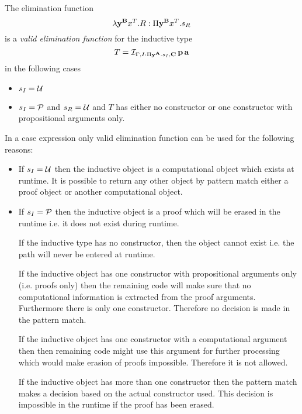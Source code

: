 \begin{definition}
  The elimination function
  $$
  \lambda \mathbf{y}^{\mathbf{B}} x^T.R : \Pi \mathbf{y}^{\mathbf{B}} x^T . s_R
  $$
  is a
  \emph{valid elimination function}
  for the inductive type
  $$
  T = {\cal I }_{\Gamma,I:\Pi \mathbf{y}^{\mathbf{A}}.s_I,\mathbf{C}} \, \mathbf{p} \,
  \mathbf{a}
  $$
  in the following cases
  \begin{itemize}

  \item $s_I = {\cal{U}}$

  \item $s_I = {\cal{P}}$ and $s_R = {\cal{U}}$ and $T$ has either no constructor or
    one constructor with propositional arguments only.

  \end{itemize}
\end{definition}
%
In a case expression only valid elimination function can be used for the
following reasons:
\begin{itemize}

\item If $s_I = {\cal{U}}$ then the inductive object is a computational object
  which exists at runtime. It is possible to return any other object by
  pattern match either a proof object or another computational object.

\item If $s_I = {\cal{P}}$ then the inductive object is a proof which will be
  erased in the runtime i.e. it does not exist during runtime.

  If the inductive type has no constructor, then the object cannot exist
  i.e. the path will never be entered at runtime.

  If the inductive object has one constructor with propositional arguments
  only (i.e. proofs only) then the remaining code will make sure that no
  computational information is extracted from the proof arguments. Furthermore
  there is only one constructor. Therefore no decision is made in the pattern
  match.

  If the inductive object has one constructor with a computational argument
  then then remaining code might use this argument for further processing
  which would make erasion of proofs impossible. Therefore it is not allowed.

  If the inductive object has more than one constructor then the pattern match
  makes a decision based on the actual constructor used. This decision is
  impossible in the runtime if the proof has been erased.
\end{itemize}




